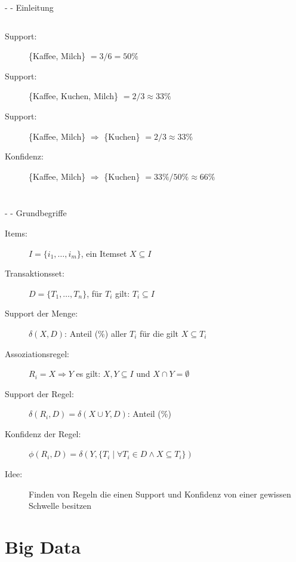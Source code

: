 \documentclass[fleqn,11pt,aspectratio=43]{beamer}
\begin{document}
\begin{frame}{\insertsectionhead - \insertsubsectionhead - Einleitung \cite{ester2000knowledge}}
\begin{columns}[onlytextwidth]
    \vspace{-1.2em}
	   \begin{description}
		   \item[Support:] \{Kaffee, Milch\} $= 3 / 6 = 50\%$
		   \item[Support:] \{Kaffee, Kuchen, Milch\} $= 2 / 3 \approx 33\%$
		   \item[Support:] \{Kaffee, Milch\} $\Rightarrow$ \{Kuchen\}  $= 2 / 3 \approx 33\%$
		   \item[Konfidenz:] \{Kaffee, Milch\} $\Rightarrow$ \{Kuchen\} $= 33\% / 50\% \approx 66\%$
	   \end{description}
\end{columns}
\end{frame}

\begin{frame}{\insertsectionhead - \insertsubsectionhead - Grundbegriffe \cite{ester2000knowledge}}
\begin{description}
\item[Items:] $I = \{i_1, \ldots, i_m\}$, ein Itemset $X \subseteq I$
\item[Transaktionsset:] $D = \{T_1, \ldots, T_n\}$, für $T_i$ gilt: $T_i \subseteq I$
\item[Support der Menge:] $\delta(X,D)$: Anteil (\%) aller $T_i$ für die gilt $X \subseteq T_i$
\item[Assoziationsregel:] $R_i = X \Rightarrow Y$ es gilt: $X, Y \subseteq I$ und $X \cap Y = \emptyset$ 
\item[Support der Regel:] $\delta(R_i, D) = \delta(X \cup Y, D)$: Anteil (\%)
\item[Konfidenz der Regel:] $\phi(R_i, D) = \delta(Y, \{T_i\;|\;\forall T_i \in D \wedge X \subseteq T_i\})$
\item[Idee:] Finden von Regeln die einen Support und Konfidenz von einer gewissen Schwelle besitzen
\end{description}
\end{frame}
		

\section{Big Data~}
\end{document}
